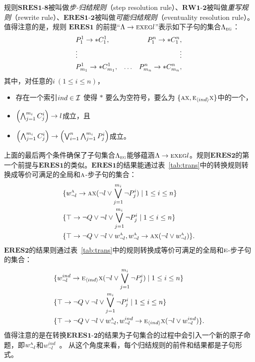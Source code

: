 规则$\textbf{SRES1-8}$被叫做\emph{步-归结规则}（step resolution rule）、$\textbf{RW1-2}$被叫做\emph{重写规则}（rewrite rule）、$\textbf{ERES1-2}$被叫做\emph{可能归结规则}（eventuality resolution rule）。
值得注意的是，规则 $\textbf{ERES1}$ 的前提“$\Lambda \rightarrow \textsc{e} \textsc{x} \textsc{e}\textsc{g} l$”表示如下子句的集合$\Lambda_{\textsc{e}\textsc{g}}$：
\begin{align*}
	& P_1^1\rightarrow *C_1^1, & & & P_1^n\rightarrow *C_1^n,\\
	& \vdots & && \vdots\\
	& P_{m_1}^1 \rightarrow * C_{m_1}^1, & \ldots && P_{m_n}^n\rightarrow *C_{m_n}^n,
\end{align*}
其中，对任意的$i~(1\le i\le n)$，
\begin{itemize}
	\item 存在一个索引$ind \in {\cal I}$ 使得 $*$ 要么为空符号，要么为 $\{\textsc{a}\textsc{x}, \textsc{e}_{{\langle{ind}\rangle}}\textsc{x}\}$中的一个，
	\item $\left(\bigwedge_{j=1}^{m_i} C_j^i\right) \rightarrow l$成立，且
	\item $\left(\bigwedge_{j=1}^{m_i} C_j^i\right) \rightarrow \left(\bigvee_{i=1}^n\bigwedge_{j=1}^{m_i} P_j^i\right)$成立。
\end{itemize}

上面的最后两个条件确保了子句集合$\Lambda_{\textsc{e}\textsc{g}}$能够蕴涵$\Lambda \rightarrow \textsc{e} \textsc{x} \textsc{e}\textsc{g} l$。规则$\textbf{ERES2}$的第一个前提与$\textbf{ERES1}$的类似。$\textbf{ERES1}$的结果能通过表~\ref{tab:trans}中的转换规则转换成等价可满足的全局和$\textsc{a}$-步子句的集合：
\begin{align*}
	& \{w_{\neg l}^{\textsc{a}} \rightarrow \textsc{a}\textsc{x}(\neg l \vee \bigvee_{j=1}^{m_i} \neg P_j^i) \mid 1 \leq i \leq n\}\\
	& \{\top \rightarrow \neg Q \vee \neg l \vee \bigvee_{j=1}^{m_i} \neg P_j^i \mid 1 \leq i \leq n\}\\
	& \{\top \rightarrow \neg Q \vee \neg l \vee w_{\neg l}^{\textsc{a}}, w_{\neg l}^{\textsc{a}} \rightarrow \textsc{a}\textsc{x}(\neg l \vee w_{\neg l}^{\textsc{a}})\}.
\end{align*}
$\textbf{ERES2}$的结果则通过表~\ref{tab:trans}中的规则转换成等价可满足的全局和$\textsc{e}$-步子句的集合：
\begin{align*}
	& \{w_{\neg l}^{ind} \rightarrow \textsc{e}_{{\langle{ind}\rangle}}\textsc{x}(\neg l \vee \bigvee_{j=1}^{m_i} \neg P_j^i) \mid 1 \leq i \leq n\}\\
	& \{\top \rightarrow \neg Q \vee \neg l \vee \bigvee_{j=1}^{m_i} \neg P_j^i \mid 1 \leq i \leq n\}\\
	& \{\top \rightarrow \neg Q \vee \neg l \vee w_{\neg l}^{\textsc{a}}, w_{\neg l}^{ind} \rightarrow \textsc{e}_{{\langle{ind}\rangle}}\textsc{x}(\neg l \vee w_{\neg l}^{ind})\}.
\end{align*}
值得注意的是在转换$\textbf{ERES1-2}$的结果为子句集合的过程中会引入一个新的原子命题，即$w_{\neg l}^{\textsc{a}}$和$w_{\neg l}^{ind}$~\cite{zhang2014resolution}。
从这个角度来看，每个归结规则的前件和结果都是子句形式。

